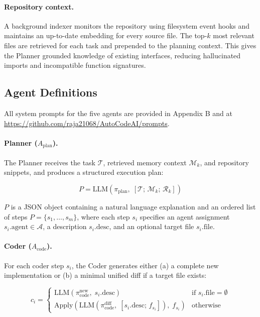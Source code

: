 \documentclass[journal]{IEEEtran}
\begin{document}
\paragraph{Repository context.}
A background indexer monitors the repository using filesystem event hooks and maintains an up-to-date embedding for every source file. The top-$k$ most relevant files are retrieved for each task and prepended to the planning context. This gives the Planner grounded knowledge of existing interfaces, reducing hallucinated imports and incompatible function signatures.

\subsection{Agent Definitions}
\label{sec:agents}

All system prompts for the five agents are provided in Appendix B and at \url{https://github.com/raja21068/AutoCodeAI/prompts}.

\paragraph{Planner ($A_\text{plan}$).}
The Planner receives the task $\mathcal{T}$, retrieved memory context $\mathcal{M}_k$, and repository snippets, and produces a structured execution plan:

\begin{equation}
  P = \text{LLM}(\pi_\text{plan},\;
      [\mathcal{T};\, \mathcal{M}_k;\, \mathcal{R}_k])
\end{equation}

\noindent $P$ is a JSON object containing a natural language explanation and an ordered list of steps $P = \{s_1, \dots, s_m\}$, where each step $s_i$ specifies an agent assignment $s_i.\text{agent} \in \mathcal{A}$, a description $s_i.\text{desc}$, and an optional target file $s_i.\text{file}$.

\paragraph{Coder ($A_\text{code}$).}
For each coder step $s_i$, the Coder generates either (a) a complete new implementation or (b) a minimal unified diff if a target file exists:

\begin{equation}
  c_i =
  \begin{cases}
    \text{LLM}(\pi_\text{code}^\text{new},\; s_i.\text{desc})
      & \text{if } s_i.\text{file} = \emptyset \\
    \text{Apply}(\text{LLM}(\pi_\text{code}^\text{diff},\;
      [s_i.\text{desc};\, f_{s_i}]),\; f_{s_i})
      & \text{otherwise}
  \end{cases}
\end{equation}
\end{document}
